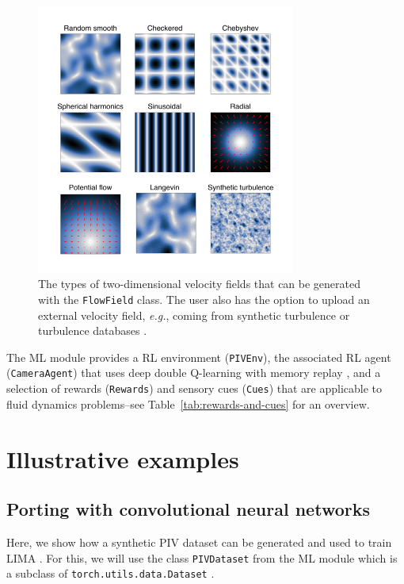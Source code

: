\documentclass[a4paper,fleqn]{cas-dc}
\begin{document}
\begin{figure}[t]
\centering
\includegraphics[width=8.5cm]{velocity-fields.pdf}
\caption{The types of two-dimensional velocity fields that can be generated with the \texttt{FlowField} class. The user also has the option to upload an external velocity field, \textit{e.g.}, coming from synthetic turbulence \citep{saad2017scalable, richards2018fast} or turbulence databases \cite{perlman2007data}.}
\label{fig:velocity-fields}
\end{figure}

The ML module provides a RL environment (\texttt{PIVEnv}), the associated RL agent (\texttt{CameraAgent}) that uses deep double Q-learning with memory replay \cite{}, and a selection of rewards (\texttt{Rewards}) and sensory cues (\texttt{Cues}) that are applicable to fluid dynamics problems--see Table~\ref{tab:rewards-and-cues} for an overview.

\section{Illustrative examples} \label{sec:examples}

\subsection{Porting with convolutional neural networks}

Here, we show how a synthetic PIV dataset can be generated and used to train LIMA \cite{manickathan2023lightweight}. For this, we will use the class \texttt{PIVDataset} from the ML module which is a subclass of \texttt{torch.utils.data.Dataset} \cite{paszke2019pytorch}.
\end{document}

